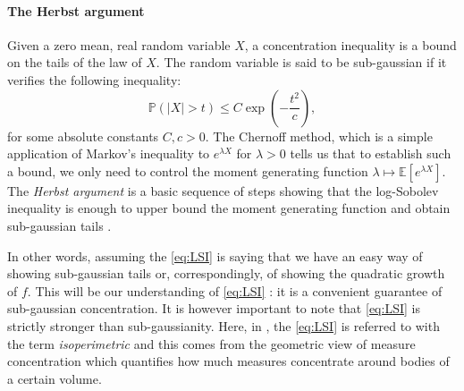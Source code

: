 \documentclass[11pt,twoside]{article}
\theoremstyle{definition}
\newcommand{\Prb}{\mathbb{P}}
\newcommand{\E}{\mathbb{E}}
\begin{document}
\begin{boxK}
\paragraph{The Herbst argument} Given a zero mean, real random variable $X$, a concentration inequality is a bound on the tails of the law of $X$. The random variable is said to be sub-gaussian if it verifies the following inequality:
\[
\Prb(|X| > t) \leq C\exp(-\frac{t^2}{c}),
\]
for some absolute constants $C, c > 0$. The Chernoff method, which is a simple application of Markov's inequality to $e^{\lambda X}$ for $\lambda >0$ tells us that to establish such a bound, we only need to control the moment generating function $\lambda \mapsto \E[e^{\lambda X}]$. The \textit{Herbst argument} is a basic sequence of steps showing that the log-Sobolev inequality is enough to upper bound the moment generating function and obtain sub-gaussian tails \cite{boucheron_concentration_2013, ane_sur_2000}.
\end{boxK} 

In other words, assuming the \eqref{eq:LSI} is saying that we have an easy way of showing sub-gaussian tails or, correspondingly, of showing the quadratic growth of $f$. This will be our understanding of \eqref{eq:LSI} : it is a convenient guarantee of sub-gaussian concentration. It is however important to note that \eqref{eq:LSI} is strictly stronger than sub-gaussianity. Here, in \cite{vempala_rapid_2019}, the \eqref{eq:LSI} is referred to with the term \textit{isoperimetric} and this comes from the geometric view of measure concentration which quantifies how much measures concentrate around bodies of a certain volume.
\end{document}

